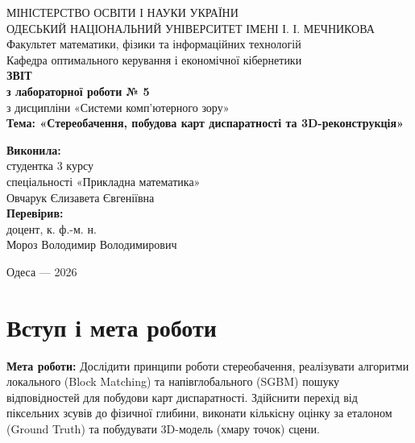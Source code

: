 \documentclass[a4paper,14pt]{extarticle}
\begin{document}
	
	\begin{titlepage}
		\begin{center}
			МІНІСТЕРСТВО ОСВІТИ І НАУКИ УКРАЇНИ\\
			ОДЕСЬКИЙ НАЦІОНАЛЬНИЙ УНІВЕРСИТЕТ ІМЕНІ І. І. МЕЧНИКОВА\\
			Факультет математики, фізики та інформаційних технологій\\
			Кафедра оптимального керування і економічної кібернетики\\[2cm]
			
			\textbf{\Large ЗВІТ}\\
			\textbf{з лабораторної роботи № 5}\\
			з дисципліни «Системи комп’ютерного зору»\\
			\textbf{Тема: «Стереобачення, побудова карт диспаратності та 3D-реконструкція»}\\[2cm]
			
			\begin{flushright}
				\textbf{Виконила:}\\
				студентка 3 курсу\\
				спеціальності «Прикладна математика»\\
				Овчарук Єлизавета Євгеніївна\\[1cm]
				
				\textbf{Перевірив:}\\
				доцент, к. ф.-м. н.\\
				Мороз Володимир Володимирович
			\end{flushright}
			
			\vfill
			Одеса — 2026
		\end{center}
	\end{titlepage}
	
	\newpage
	\tableofcontents
	\newpage
	
	\section*{Вступ і мета роботи}
	\textbf{Мета роботи:} Дослідити принципи роботи стереобачення, реалізувати алгоритми локального (Block Matching) та напівглобального (SGBM) пошуку відповідностей для побудови карт диспаратності. Здійснити перехід від піксельних зсувів до фізичної глибини, виконати кількісну оцінку за еталоном (Ground Truth) та побудувати 3D-модель (хмару точок) сцени.
	
\end{document}
